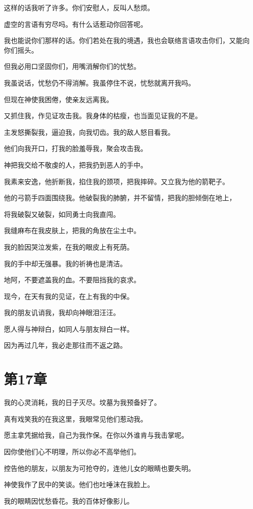 \documentclass[12pt,oneside]{book}
\begin{document}
这样的话我听了许多。你们安慰人，反叫人愁烦。

虚空的言语有穷尽吗。有什么话惹动你回答呢。

我也能说你们那样的话。你们若处在我的境遇，我也会联络言语攻击你们，又能向你们摇头。

但我必用口坚固你们，用嘴消解你们的忧愁。

我虽说话，忧愁仍不得消解。我虽停住不说，忧愁就离开我吗。

但现在神使我困倦，使亲友远离我。

又抓住我，作见证攻击我。我身体的枯瘦，也当面见证我的不是。

主发怒撕裂我，逼迫我，向我切齿。我的敌人怒目看我。

他们向我开口，打我的脸羞辱我，聚会攻击我。

神把我交给不敬虔的人，把我扔到恶人的手中。

我素来安逸，他折断我，掐住我的颈项，把我摔碎。又立我为他的箭靶子。

他的弓箭手四面围绕我。他破裂我的肺腑，并不留情，把我的胆倾倒在地上，

将我破裂又破裂，如同勇士向我直闯。

我缝麻布在我皮肤上，把我的角放在尘土中。

我的脸因哭泣发紫，在我的眼皮上有死荫。

我的手中却无强暴。我的祈祷也是清洁。

地阿，不要遮盖我的血。不要阻挡我的哀求。

现今，在天有我的见证，在上有我的中保。

我的朋友讥诮我，我却向神眼泪汪汪。

愿人得与神辩白，如同人与朋友辩白一样。

因为再过几年，我必走那往而不返之路。


\chapter{第17章}
我的心灵消耗，我的日子灭尽。坟墓为我预备好了。

真有戏笑我的在我这里，我眼常见他们惹动我。

愿主拿凭据给我，自己为我作保。在你以外谁肯与我击掌呢。

因你使他们心不明理，所以你必不高举他们。

控告他的朋友，以朋友为可抢夺的，连他儿女的眼睛也要失明。

神使我作了民中的笑谈。他们也吐唾沫在我脸上。

我的眼睛因忧愁昏花。我的百体好像影儿。
\end{document}
